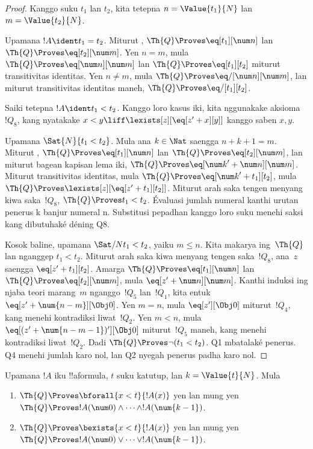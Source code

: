 \documentclass[../../../include/open-logic-section]{subfiles}
\begin{document}
\begin{proof}
Kanggo suku $t_1$ lan $t_2$, kita tetepna
$n = \Value{t_1}{N}$ lan $m = \Value{t_2}{N}$.

Upamana $!A \ident t_1 = t_2$. Miturut
,
$\Th{Q} \Proves \eq[t_1][\num n]$ lan
$\Th{Q} \Proves \eq[t_2][\num m]$.
Yen $n = m$, mula $\Th{Q} \Proves \eq[\num n][\num m]$ lan
$\Th{Q} \Proves \eq[t_1][t_2]$ miturut transitivitas identitas.
Yen $n \neq m$, mula $\Th{Q} \Proves \eq/[\num n][\num m]$,
lan miturut transitivitas identitas maneh,
$\Th{Q} \Proves \eq/[t_1][t_2]$.

Saiki tetepna $!A \ident t_1 < t_2$. Kanggo loro kasus iki, kita
nggunakake aksioma~$!Q_8$, kang nyatakake
$x < y \liff \lexists[z][\eq[z' + x][y]]$ kanggo saben $x,y$.

Upamana $\Sat{N}{t_1 < t_2}$. Mula ana $k \in \Nat$ saengga
$n + k + 1 = m$. Miturut ,
$\Th{Q} \Proves \eq[t_1][\num n]$ lan
$\Th{Q} \Proves \eq[t_2][\num m]$, lan miturut bagean kapisan
lema iki, $\Th{Q} \Proves \eq[{\num k}' + \num n][\num m]$.
Miturut transitivitas identitas, mula
$\Th{Q} \Proves \eq[{\num k}' + t_1][t_2]$,
mula $\Th{Q} \Proves \lexists[z][\eq[z' + t_1][t_2]]$.
Miturut arah saka tengen menyang kiwa saka~$!Q_8$,
$\Th{Q} \Proves t_1 < t_2$. Évaluasi jumlah numeral kanthi urutan penerus k banjur numeral n. Substitusi pepadhan kanggo loro suku menehi saksi kang dibutuhaké déning Q8.

Kosok baline, upamana $\Sat/{N}{t_1 < t_2}$, yaiku $m \leq n$.
%
Kita makarya ing~$\Th{Q}$ lan nganggep $t_1 < t_2$. Miturut arah
saka kiwa menyang tengen saka~$!Q_8$, ana~$z$ saengga
$\eq[z' + t_1][t_2]$. Amarga
$\Th{Q} \Proves \eq[t_1][\num n]$ lan
$\Th{Q} \Proves \eq[t_2][\num m]$, mula
$\eq[z' + \num n][\num m]$.
%
Kanthi induksi ing njaba teori marang~$m$ nganggo~$!Q_5$ lan~$!Q_1$, kita entuk
$\eq[z' + \num{n - m}][\Obj 0]$.
Yen $m = n$, mula $\eq[z'][\Obj 0]$ miturut~$!Q_4$, kang menehi kontradiksi
liwat~$!Q_2$. Yen $m < n$, mula
$\eq[(z' + \num{n - m - 1})'][\Obj 0]$ miturut~$!Q_5$ maneh,
kang menehi kontradiksi liwat~$!Q_2$.
Dadi $\Th{Q} \Proves \lnot(t_1 < t_2)$. Q1 mbatalaké penerus. Q4 menehi jumlah karo nol, lan Q2 nyegah penerus padha karo nol.
\end{proof}

\begin{lem}
Upamana $!A$ iku !!a{formula}, $t$ suku katutup, lan
$k=\Value{t}{N}$. Mula
\begin{enumerate}
\item $\Th{Q} \Proves \bforall{x<t}{!A(x)}$ yen lan mung yen $\Th{Q} \Proves
    !A(\num 0) \land \dots \land !A(\num{k-1})$.
\item $\Th{Q} \Proves \bexists{x<t}{!A(x)}$ yen lan mung yen $\Th{Q} \Proves
    !A(\num 0) \lor \dots \lor !A(\num{k-1})$.
\end{enumerate}
\end{lem}
\end{document}
